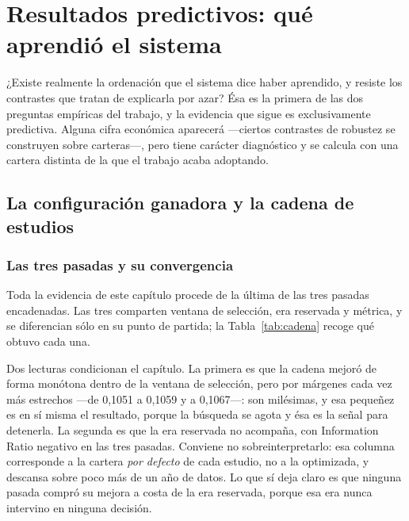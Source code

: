 \chapter{Resultados predictivos: qué aprendió el sistema}
\label{chap:resultados}

¿Existe realmente la ordenación que el sistema dice haber aprendido, y resiste los contrastes que
tratan de explicarla por azar? Ésa es la primera de las dos preguntas empíricas del trabajo, y la
evidencia que sigue es exclusivamente predictiva. Alguna cifra económica aparecerá ---ciertos
contrastes de robustez se construyen sobre carteras---, pero tiene carácter diagnóstico y se calcula
con una cartera distinta de la que el trabajo acaba adoptando.

\section{La configuración ganadora y la cadena de estudios}
\label{sec:configuracion-ganadora}

\subsection{Las tres pasadas y su convergencia}

Toda la evidencia de este capítulo procede de la última de las tres pasadas encadenadas. Las tres
comparten ventana de selección, era reservada y métrica, y se diferencian sólo en su punto de
partida; la Tabla~\ref{tab:cadena} recoge qué obtuvo cada una.

\begin{table}[htbp]
  \centering
  \small
  \caption{Las tres pasadas de la cadena y su ganador.}
  \label{tab:cadena}
  {\setlength{\tabcolsep}{5.8pt}}
  \caption*{Rank-IC, IC-IR y $t$ de Newey--West son de la ventana de selección. «Transf.» es el
  coeficiente de transferencia introducido en el Capítulo~\ref{chap:estado-arte}: la fracción de la
  señal disponible que llega a expresarse en posiciones. IR y exceso corresponden a la cartera
  \emph{por defecto} de cada estudio, no a la optimizada del
  Capítulo~\ref{chap:resultados-economicos}.}
\end{table}

Dos lecturas condicionan el capítulo. La primera es que la cadena mejoró de forma monótona dentro de
la ventana de selección, pero por márgenes cada vez más estrechos ---de 0,1051 a 0,1059 y a
0,1067---: son milésimas, y esa pequeñez es en sí misma el resultado, porque la búsqueda se agota y
ésa es la señal para detenerla. La segunda es que la era reservada no acompaña, con Information
Ratio negativo en las tres pasadas. Conviene no sobreinterpretarlo: esa columna corresponde a la
cartera \emph{por defecto} de cada estudio, no a la optimizada, y descansa sobre poco más de un año
de datos. Lo que sí deja claro es que ninguna pasada compró su mejora a costa de la era reservada,
porque esa era nunca intervino en ninguna decisión.


